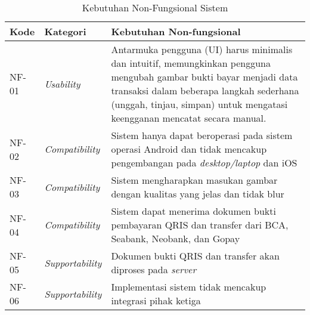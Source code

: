\begin{table}[h!]
\caption{Kebutuhan Non-Fungsional Sistem}
\label{tab:kebutuhan-non-fungsional}
\begin{tabularx}{\linewidth}{|l|l|X|}
\hline
\textbf{Kode} & \textbf{Kategori} & \textbf{Kebutuhan Non-fungsional} \\
\hline
NF-01 & \emph{Usability} & Antarmuka pengguna (UI) harus minimalis dan intuitif, memungkinkan pengguna mengubah gambar bukti bayar menjadi data transaksi dalam beberapa langkah sederhana (unggah, tinjau, simpan) untuk mengatasi keengganan mencatat secara manual. \\
\hline
NF-02 & \emph{Compatibility} & Sistem hanya dapat beroperasi pada sistem operasi \linebreak Android dan tidak mencakup pengembangan pada \emph{desktop/laptop} dan iOS \\
\hline
NF-03 & \emph{Compatibility} & Sistem mengharapkan masukan gambar dengan \linebreak kualitas yang jelas dan tidak blur \\
\hline
NF-04 & \emph{Compatibility} & Sistem dapat menerima dokumen bukti pembayaran QRIS dan transfer dari BCA, Seabank, Neobank, dan Gopay \\
\hline
NF-05 & \emph{Supportability} & Dokumen bukti QRIS dan transfer akan diproses pada \emph{server} \\
\hline
NF-06 & \emph{Supportability} & Implementasi sistem tidak mencakup integrasi  pihak ketiga \\
\hline
\end{tabularx}
\end{table}